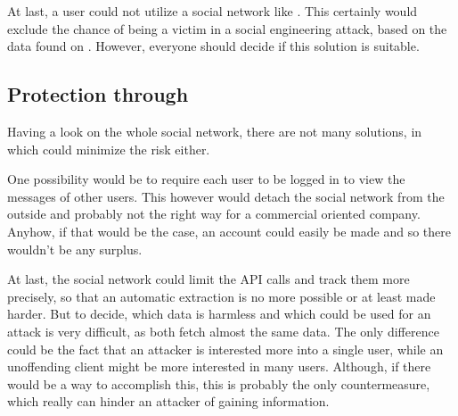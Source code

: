 At last, a user could not utilize a social network like \Twitter{}. This certainly
would exclude the chance of being a victim in a social engineering attack,
based on the data found on \Twitter{}. However, everyone should decide if this
solution is suitable.


\subsection{Protection through \Twitter{}}

Having a look on the whole social network, there are not many solutions, in
which \Twitter{} could minimize the risk either.

One possibility would be to require each user to be logged in to view the
messages of other users. This however would detach the \Twitter{} social
network from the outside and probably not the right way for a commercial
oriented company. Anyhow, if that would be the case, an account could easily be
made and so there wouldn't be any surplus.

At last, the social network could limit the API calls and track them more
precisely, so that an automatic extraction is no more possible or at least made
harder. But to decide, which data is harmless and which could be used for an
attack is very difficult, as both fetch almost the same data. The only
difference could be the fact that an attacker is interested more into a single
user, while an unoffending \Twitter{} client might be more interested in many
users. Although, if there would be a way to accomplish this, this is probably
the only countermeasure, which really can hinder an attacker of gaining
information.
